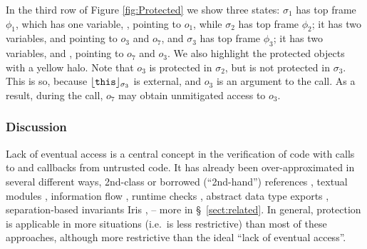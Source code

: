 In the third row of   Figure \ref{fig:Protected} we show three states: 
 $\sigma_1$ has  top frame $\phi_1$, which has  one variable, , pointing to $o_1$, while 
 $\sigma_2$ has  top frame $\phi_2$; it has two  variables,    and  pointing to $o_3$ and  $o_7$, and 
 $\sigma_3$ has  top frame $\phi_3$; it has two  variables,   and , pointing to $o_7$ and $o_3$.  
% 
We also   highlight the protected objects with a yellow halo.
 Note that $o_3$ is protected in $\sigma_2$, but is not protected in $\sigma_3$. This is so, because $\interpret {\sigma_3} {\prg{this}}$  is external, and  $o_3$ is an argument to the call. As a result, during the call, $o_7$ may obtain unmitigated access to $o_3$. 

\subsubsection*{Discussion} 
Lack of eventual access is a central concept in the verification of code with calls to and callbacks  from untrusted code.
It has already been over-approximated in several different ways, \eg
2nd-class \cite{rompf-second-class-oopsla2016,rompf-dont-pop-second-class-ecoop2022}
or borrowed (``2nd-hand'') references
\cite{boyland-promises-icse1998,boyland-aliasburying-spe2001},
 textual modules \cite{OOPSLA22},
information flow \cite{ddd}, runtime
checks \cite{secure-io-fstar-popl2024},
abstract data type exports \cite{vmsl-pldi2023},
  separation-based invariants 
Iris \cite{iris-wasm-pldi2023,cerise-jacm2024},
-- more in  \S~\ref{sect:related}.
In general, protection is applicable in more situations (i.e.\ is less
restrictive) than most of these approaches,
 although more restrictive than the ideal ``lack of eventual access''. 

